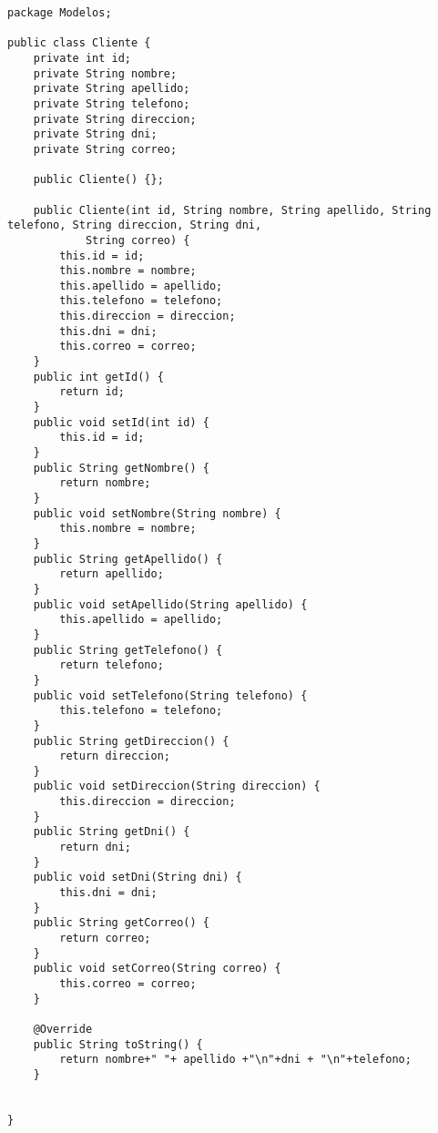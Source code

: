 


\begin{lstlisting}[caption=Cliente.java (App Escritorio)]
package Modelos;

public class Cliente {
	private int id;
	private String nombre;
	private String apellido;
	private String telefono;
	private String direccion;
	private String dni;
	private String correo;
	
	public Cliente() {};
	
	public Cliente(int id, String nombre, String apellido, String telefono, String direccion, String dni,
			String correo) {
		this.id = id;
		this.nombre = nombre;
		this.apellido = apellido;
		this.telefono = telefono;
		this.direccion = direccion;
		this.dni = dni;
		this.correo = correo;
	}
	public int getId() {
		return id;
	}
	public void setId(int id) {
		this.id = id;
	}
	public String getNombre() {
		return nombre;
	}
	public void setNombre(String nombre) {
		this.nombre = nombre;
	}
	public String getApellido() {
		return apellido;
	}
	public void setApellido(String apellido) {
		this.apellido = apellido;
	}
	public String getTelefono() {
		return telefono;
	}
	public void setTelefono(String telefono) {
		this.telefono = telefono;
	}
	public String getDireccion() {
		return direccion;
	}
	public void setDireccion(String direccion) {
		this.direccion = direccion;
	}
	public String getDni() {
		return dni;
	}
	public void setDni(String dni) {
		this.dni = dni;
	}
	public String getCorreo() {
		return correo;
	}
	public void setCorreo(String correo) {
		this.correo = correo;
	}
	
	@Override
	public String toString() {
		return nombre+" "+ apellido +"\n"+dni + "\n"+telefono;
	}
	
	
}
\end{lstlisting}

